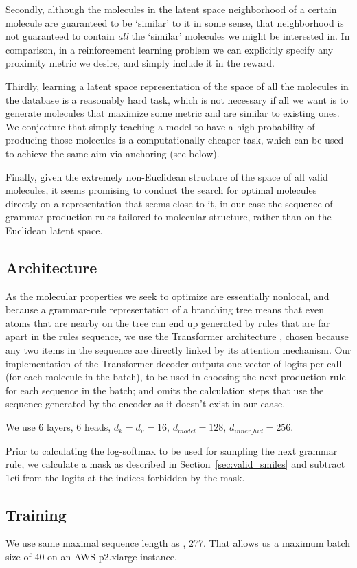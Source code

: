\documentclass{article}
\begin{document}
Secondly, although the molecules in the latent space neighborhood of a certain molecule are guaranteed to be `similar' to it in some sense, that neighborhood is not guaranteed to contain \emph{all} the `similar' molecules we might be interested in. In comparison, in a reinforcement learning problem we can explicitly specify any proximity metric we desire, and simply include it in the reward. 

Thirdly, learning a latent space representation of the space of all the molecules in the database is a reasonably hard task, which is not necessary if all we want is to generate molecules that maximize some metric and are similar to existing ones. We conjecture that simply teaching a model to have a high probability of producing those molecules is a computationally cheaper task, which can be used to achieve the same aim via anchoring (see below).

Finally, given the extremely non-Euclidean structure of the space of all valid molecules, it seems promising to conduct the search for optimal molecules directly on a representation that seems close to it, in our case the sequence of grammar production rules tailored to molecular structure, rather than on the Euclidean latent space. 
\subsection{Architecture}
As the molecular properties we seek to optimize are essentially nonlocal, and because a grammar-rule representation of a branching tree means that even atoms that are nearby on the tree can end up generated by rules that are far apart in the rules sequence, we use the Transformer architecture \cite{Transformer17}, chosen because any two items in the sequence are directly linked by its attention mechanism. Our implementation of the Transformer decoder outputs one vector of logits per call (for each molecule in the batch), to be used in choosing the next production rule for each sequence in the batch; and omits the calculation steps that use the sequence generated by the encoder as it doesn't exist in our caase.

We use 6 layers, 6 heads, $d_k=d_v=16$, $d_{model}=128$, $d_{inner\_hid}=256$.

Prior to calculating the log-softmax to be used for sampling the next grammar rule, we calculate a mask as described in Section~\ref{sec:valid_smiles} and subtract 1e6 from the logits at the indices forbidden by the mask. 
\subsection{Training}\label{sec:training}
We use same maximal sequence length as \cite{kusner17}, 277.
That allows us a maximum batch size of 40 on an AWS p2.xlarge instance. 
\end{document}
